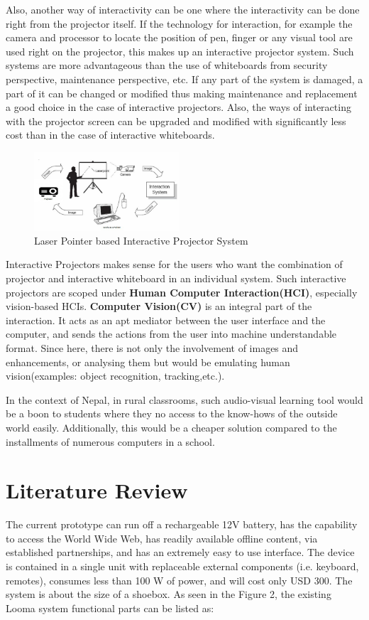 \documentclass[12pt, a4paper]{article}
\begin{document}
Also, another way of interactivity can be one where the interactivity can be done right from the projector itself. If the technology for interaction, for example the camera and processor to locate the position of pen, finger or any visual tool are used right on the projector, this makes up an interactive projector system. Such systems are more advantageous than the use of whiteboards from security perspective, maintenance perspective, etc. If any part of the system is damaged, a part of it can be changed or modified thus making maintenance and replacement a good choice in the case of interactive projectors. Also, the ways of interacting with the projector screen can be upgraded and modified with significantly less cost than in the case of interactive whiteboards.


\begin{figure}
	\centering
		\includegraphics[width=0.48\textwidth]{abc.jpg}
	\caption{Laser Pointer based Interactive Projector System}
\end{figure}

Interactive Projectors makes sense for the users who want the combination of projector and interactive whiteboard in an individual system. Such interactive projectors are scoped under \textbf{Human Computer Interaction(HCI)}, especially vision-based HCIs. \textbf{Computer Vision(CV)} is an integral part of the interaction. It acts as an apt mediator between the user interface and the computer, and sends the actions from the user into machine understandable format. Since here, there is not only the involvement of images and enhancements, or analysing them but would be emulating human vision(examples: object recognition, tracking,etc.).

In the context of Nepal, in rural classrooms, such audio-visual learning tool would be a boon to students where they no access to the know-hows of the outside world easily. Additionally, this would be a cheaper solution compared to the installments of numerous computers in a school. 


\newpage
\section{Literature Review}
The current prototype can run off a rechargeable 12V battery, has the capability to access the World Wide Web, has readily available offline content, via established partnerships, and has an extremely easy to use interface. The device is contained in a single unit with replaceable external components (i.e. keyboard, remotes), consumes less than 100 W of power, and will cost only USD 300. The system is about the size of a shoebox. 
As seen in the Figure 2, the existing Looma system functional parts can be listed as:
\end{document}
